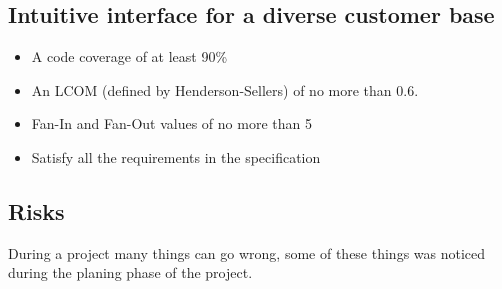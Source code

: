 \documentclass[a4paper,twoside,titlepage]{article}
\begin{document}
	\subsection{Intuitive interface for a diverse customer base}
	\begin{itemize}
	 	\item A code coverage of at least 90\%
		\item An LCOM (defined by Henderson-Sellers) of no more than 0.6.
		\item Fan-In and Fan-Out values of no more than 5
		\item Satisfy all the requirements in the specification
	\end{itemize}

	\subsection{Risks}
		During a project many things can go wrong, some of these things was noticed during the planing phase of the project.
\end{document}
